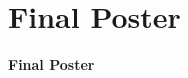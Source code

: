 \newpage
\section{Final Poster}
\vspace{\fill}

	{\Huge\bfseries Final Poster\par}

\vspace{\fill}
\newpage
